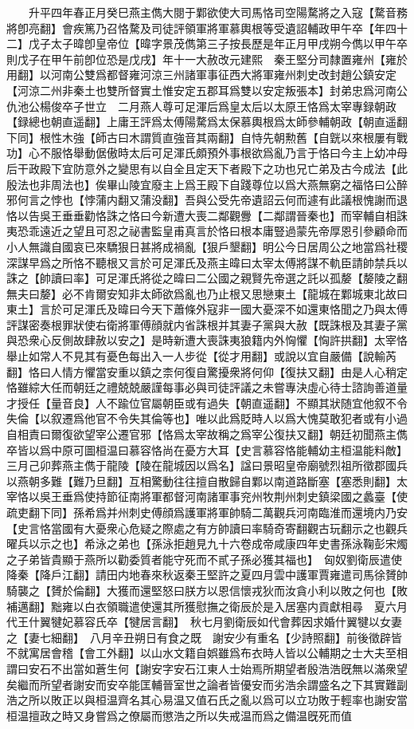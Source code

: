 　　升平四年春正月癸巳燕主儁大閱于鄴欲使大司馬恪司空陽騖將之入寇【騖音務將卽亮翻】會疾篤乃召恪騖及司徒評領軍將軍慕輿根等受遺詔輔政甲午卒【年四十二】戊子太子暐卽皇帝位【暐字景茂儁第三子按長歷是年正月甲戌朔今儁以甲午卒則戊子在甲午前卽位恐是戊戌】年十一大赦改元建熙　秦王堅分司隸置雍州【雍於用翻】以河南公雙爲都督雍河涼三州諸軍事征西大將軍雍州刺史改封趙公鎮安定【河涼二州非秦土也雙所督實土惟安定五郡耳爲雙以安定叛張本】封弟忠爲河南公　仇池公楊俊卒子世立　二月燕人尊可足渾后爲皇太后以太原王恪爲太宰專録朝政【録總也朝直遥翻】上庸王評爲太傅陽騖爲太保慕輿根爲太師參輔朝政【朝直遥翻下同】根性木強【師古曰木謂質直強音其兩翻】自恃先朝勲舊【自皝以來根屢有戰功】心不服恪舉動倨傲時太后可足渾氏頗預外事根欲爲亂乃言于恪曰今主上幼冲母后干政殿下宜防意外之變思有以自全且定天下者殿下之功也兄亡弟及古今成法【此殷法也非周法也】俟畢山陵宜廢主上爲王殿下自踐尊位以爲大燕無窮之福恪曰公醉邪何言之悖也【悖蒲内翻又蒲没翻】吾與公受先帝遺詔云何而遽有此議根愧謝而退恪以告吳王垂垂勸恪誅之恪曰今新遭大喪二鄰觀釁【二鄰謂晉秦也】而宰輔自相誅夷恐乖遠近之望且可忍之祕書監皇甫真言於恪曰根本庸豎過蒙先帝厚恩引參顧命而小人無識自國哀已來驕狠日甚將成禍亂【狠戶墾翻】明公今日居周公之地當爲社稷深謀早爲之所恪不聽根又言於可足渾氏及燕主暐曰太宰太傅將謀不軌臣請帥禁兵以誅之【帥讀曰率】可足渾氏將從之暐曰二公國之親賢先帝選之託以孤嫠【嫠陵之翻無夫曰嫠】必不肯爾安知非太師欲爲亂也乃止根又思戀東土【龍城在鄴城東北故曰東土】言於可足渾氏及暐曰今天下蕭條外寇非一國大憂深不如還東恪聞之乃與太傅評謀密奏根罪狀使右衛將軍傅顔就内省誅根并其妻子黨與大赦【既誅根及其妻子黨與恐衆心反側故肆赦以安之】是時新遭大喪誅夷狼籍内外恟懼【恟許拱翻】太宰恪舉止如常人不見其有憂色每出入一人步從【從才用翻】或說以宜自嚴備【說輸芮翻】恪曰人情方懼當安重以鎮之柰何復自驚擾衆將何仰【復扶又翻】由是人心稍定恪雖綜大任而朝廷之禮兢兢嚴謹每事必與司徒評議之未嘗專決虛心待士諮詢善道量才授任【量音良】人不踰位官屬朝臣或有過失【朝直遥翻】不顯其狀随宜他叙不令失倫【以叙遷爲他官不令失其倫等也】唯以此爲貶時人以爲大愧莫敢犯者或有小過自相責曰爾復欲望宰公遷官邪【恪爲太宰故稱之爲宰公復扶又翻】朝廷初聞燕主儁卒皆以爲中原可圖桓温曰慕容恪尚在憂方大耳【史言慕容恪能輔幼主桓温能料敵】三月己卯葬燕主儁于龍陵【陵在龍城因以爲名】諡曰景昭皇帝廟號烈祖所徵郡國兵以燕朝多難【難乃旦翻】互相驚動往往擅自散歸自鄴以南道路斷塞【塞悉則翻】太宰恪以吳王垂爲使持節征南將軍都督河南諸軍事兖州牧荆州刺史鎮梁國之蠡臺【使疏吏翻下同】孫希爲并州刺史傅顔爲護軍將軍帥騎二萬觀兵河南臨淮而還境内乃安【史言恪當國有大憂衆心危疑之際處之有方帥讀曰率騎奇寄翻觀古玩翻示之也觀兵曜兵以示之也】希泳之弟也【孫泳拒趙見九十六卷成帝咸康四年史書孫泳鞠彭宋燭之子弟皆貴顯于燕所以勸委質者能守死而不貳子孫必獲其福也】　匈奴劉衛辰遣使降秦【降戶江翻】請田内地春來秋返秦王堅許之夏四月雲中護軍賈雍遣司馬徐贇帥騎襲之【贇於倫翻】大獲而還堅怒曰朕方以恩信懷戎狄而汝貪小利以敗之何也【敗補邁翻】黜雍以白衣領職遣使還其所獲慰撫之衛辰於是入居塞内貢獻相尋　夏六月代王什翼犍妃慕容氏卒【犍居言翻】　秋七月劉衛辰如代會葬因求婚什翼犍以女妻之【妻七細翻】　八月辛丑朔日有食之既　謝安少有重名【少詩照翻】前後徵辟皆不就寓居會稽【會工外翻】以山水文籍自娯雖爲布衣時人皆以公輔期之士大夫至相謂曰安石不出當如蒼生何【謝安字安石江東人士始焉所期望者殷浩浩旣無以滿衆望矣繼而所望者謝安而安卒能匡輔晉室世之論者皆優安而劣浩余謂盛名之下其實難副浩之所以敗正以與桓温齊名其心易温又值石氏之亂以爲可以立功敗于輕率也謝安當桓温擅政之時又身嘗爲之僚屬而懲浩之所以失戒温而爲之備温旣死而值